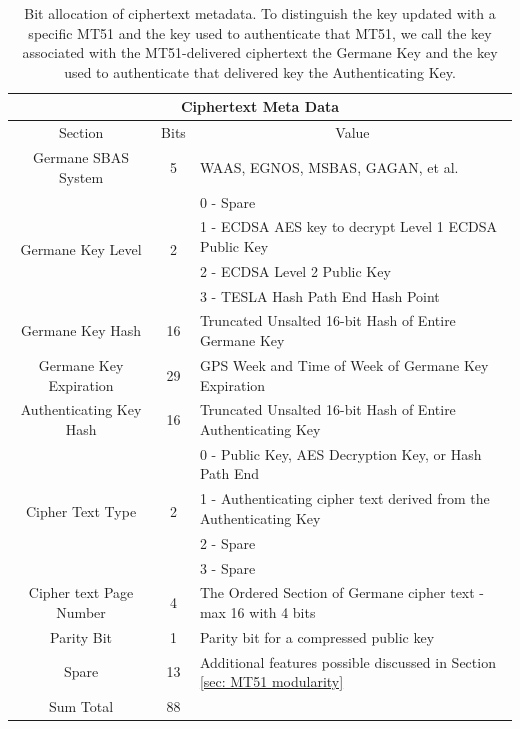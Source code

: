 \documentclass[letterpaper,times]{IONconf/IONconf}
\begin{document}
\begin{table}[H]
\center
\begin{tabular}{|c|c|l|} \hline
	\multicolumn{3}{|c|}{Ciphertext Meta Data} \\ \hline
	Section & Bits & \multicolumn{1}{|c|}{Value} \\ \hline
	Germane SBAS System & 5 & WAAS, EGNOS, MSBAS, GAGAN, et al. \\ \hline
	\multirow{4}{*}{Germane Key Level} & \multirow{4}{*}{2} & 0 - Spare \\ 
	& & 1 - ECDSA AES key to decrypt Level 1 ECDSA Public Key \\
	& & 2 - ECDSA Level 2 Public Key \\
	& & 3 - TESLA Hash Path End Hash Point \\ \hline
	Germane Key Hash & 16 & Truncated Unsalted 16-bit Hash of Entire Germane Key \\ \hline
	Germane Key Expiration & 29 & GPS Week and Time of Week of Germane Key Expiration \\ \hline
	Authenticating Key Hash & 16 & Truncated Unsalted 16-bit Hash of Entire Authenticating Key \\ \hline
	\multirow{4}{*}{Cipher Text Type} & \multirow{4}{*}{2} & 0 - Public Key, AES Decryption Key, or Hash Path End \\
	& & 1 - Authenticating cipher text derived from the Authenticating Key \\ 
	& & 2 - Spare \\ 
	& & 3 - Spare \\ \hline
	Cipher text Page Number & 4 & The Ordered Section of Germane cipher text - max 16 with 4 bits\\ \hline
	Parity Bit & 1 & Parity bit for a compressed public key \\ \hline
	Spare & 13 & Additional features possible discussed in Section \ref{sec: MT51 modularity} \\ \hline
	Sum Total & 88 & \\ \hline
\end{tabular}
\caption{Bit allocation of ciphertext metadata. To distinguish the key updated with a specific MT51 and the key used to authenticate that MT51, we call the key associated with the MT51-delivered ciphertext the Germane Key and the key used to authenticate that delivered key the Authenticating Key.}
\label{tab: meta-data table}
\end{table}
\end{document}
